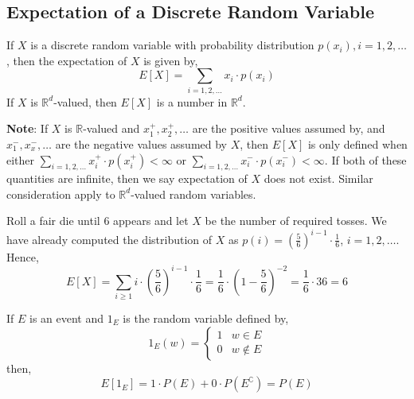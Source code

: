 \subsection{Expectation of a Discrete Random Variable}
\begin{definition}
        If $X$ is a discrete random variable with probability distribution
    $p(x_i), i = 1, 2, \dots$, then the expectation of $X$ is given by,
    \begin{equation*}
        E[X] = \sum_{i = 1, 2, \dots} x_i \cdot p(x_i)
    \end{equation*}
        If $X$ is $\mathbb{R}^d$-valued, then $E[X]$ is a number in
    $\mathbb{R}^d$.
\end{definition}

\noindent
\textbf{Note}: If $X$ is $\mathbb{R}$-valued and $x_1^+, x_2^+, \dots$ are the
positive values assumed by, and $x_1^-, x_x^-, \dots$ are the negative values
assumed by $X$, then $E[X]$ is only defined when either $\sum_{i = 1, 2,
\dots} x_i^+ \cdot p(x_i^+) < \infty$ or $\sum_{i=1, 2, \dots} x_i^- \cdot
p(x_i^-) < \infty$. If both of these quantities are infinite, then we say
expectation of $X$ does not exist. Similar consideration apply to
$\mathbb{R}^d$-valued random variables.

\begin{example}
    Roll a fair die until $6$ appears and let $X$ be the number of required
tosses. We have already computed the distribution of $X$ as $p(i) =
(\frac{5}{6})^{i-1} \cdot \frac{1}{6}$, $i = 1, 2, \dots$. Hence, 
\begin{equation*}
    E[X] = \sum_{i \geq 1} i \cdot (\frac{5}{6})^{i-1} \cdot \frac{1}{6}    
         = \frac{1}{6} \cdot (1 - \frac{5}{6})^{-2}                         
         = \frac{1}{6} \cdot 36
         = 6
\end{equation*}
\end{example}

\begin{example}
    If $E$ is an event and $1_E$ is the random variable defined by,
    \begin{equation*}
        1_E(w) = \begin{cases}
            1 & w \in E                                                      \\
            0 & w \notin E
        \end{cases}
    \end{equation*}
    then, 
    \begin{equation*}
        E[1_E] = 1 \cdot P(E) + 0 \cdot P(E^\complement) 
               = P(E)
    \end{equation*}
\end{example}

